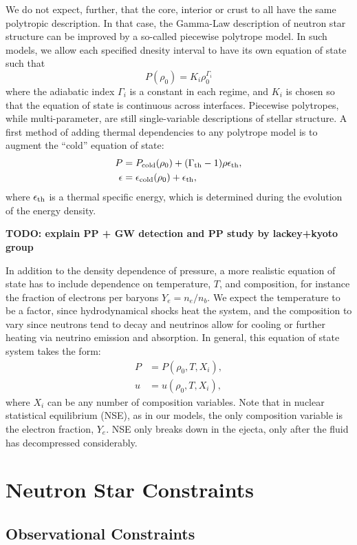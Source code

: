 We do not expect, further, that the core, interior or crust to all have the same polytropic description.
In that case, the Gamma-Law description of neutron star structure can be improved by a so-called piecewise polytrope model.
In such models, we allow each specified dnesity interval to have its own equation of state such that 
$$P(\rho_0) = K_i \rho_0^{\Gamma_i}$$
where the adiabatic index $\Gamma_i$ is a constant in each regime, and $K_i$ is chosen so that the equation of state is continuous across interfaces.  
Piecewise polytropes, while multi-parameter, are still single-variable descriptions of stellar structure.  
A first method of adding thermal dependencies to any polytrope model is to augment the ``cold'' equation of state:
\begin{align}
P &=  P_{\rm cold}(\rho_0) + (\Gamma_{\rm th}-1)\rho\epsilon_{\rm th} ,\\
\epsilon &=  \epsilon_{\rm cold}(\rho_0) + \epsilon_{\rm th}, 
\end{align}
where $\epsilon_{\rm th}$ is a thermal specific energy, which is determined during the evolution of the energy density.

\textbf{TODO: explain PP + GW detection and PP study by lackey+kyoto group}


In addition to the density dependence of pressure, a more realistic equation of state has to include dependence on temperature, $T$, and composition, for instance the fraction of electrons per baryons $Y_e = n_e / n_b$.  
We expect the temperature to be a factor, since hydrodynamical shocks heat the system, and the composition to vary since neutrons tend to decay and neutrinos allow for cooling or further heating via neutrino emission and absorption. 
In general, this equation of state system takes the form:
\begin{align}
P &= P(\rho_0, T, X_i), \\
u &= u(\rho_0, T, X_i),
\end{align}
where $X_i$ can be any number of composition variables.  
Note that in nuclear statistical equilibrium (NSE), as in our models, the only composition variable is the electron fraction, $Y_e$.  
NSE only breaks down in the ejecta, only after the fluid has decompressed considerably.

\section{Neutron Star Constraints}
\label{sec:constraints}

\subsection{Observational Constraints}

